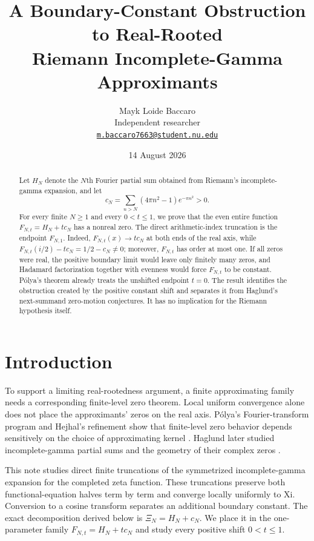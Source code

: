 \documentclass[11pt,a4paper]{amsart}
\title[Boundary-constant obstruction]
{A Boundary-Constant Obstruction to Real-Rooted\\
Riemann Incomplete-Gamma Approximants}
\author[Mayk Loide Baccaro]{Mayk Loide Baccaro\\
Independent researcher\\
\href{mailto:m.baccaro7663@student.nu.edu}{\texttt{m.baccaro7663@student.nu.edu}}}
\date{14 August 2026}
\theoremstyle{remark}
\begin{document}
\raggedbottom

\begin{abstract}
Let $H_N$ denote the $N$th Fourier partial sum obtained from Riemann's
incomplete-gamma expansion, and let
\[
 c_N=\sum_{n>N}(4\pi n^2-1)e^{-\pi n^2}>0.
\]
For every finite $N\geq1$ and every $0<t\leq1$, we prove that the even entire
function $F_{N,t}=H_N+t c_N$ has a nonreal zero.  The direct arithmetic-index
truncation is the endpoint $F_{N,1}$.  Indeed, $F_{N,t}(x)\to t c_N$ at both
ends of the real axis, while $F_{N,t}(i/2)-t c_N=1/2-c_N\ne0$; moreover,
$F_{N,t}$ has order at most one.  If all zeros were real, the positive
boundary limit would leave only finitely many zeros, and Hadamard
factorization together with evenness would force $F_{N,t}$ to be constant.
P\'olya's theorem already treats the unshifted endpoint $t=0$.  The result
identifies the obstruction created by the positive constant shift and separates it
from Haglund's next-summand zero-motion conjectures.  It has no implication
for the Riemann hypothesis itself.
\end{abstract}

\maketitle

\section{Introduction}

To support a limiting real-rootedness argument, a finite approximating family
needs a corresponding finite-level zero theorem.  Local uniform convergence
alone does not place the approximants' zeros on the real axis.  P\'olya's
Fourier-transform program and Hejhal's refinement show that finite-level zero
behavior depends sensitively on the choice of approximating kernel
\cite{Polya1926,Hejhal1990}.  Haglund later studied incomplete-gamma partial
sums and the geometry of their complex zeros \cite{Haglund2011}.

This note studies direct finite truncations of the symmetrized
incomplete-gamma expansion for the completed zeta function.  These truncations
preserve both functional-equation halves term by term and converge locally
uniformly to Xi.  Conversion to a cosine transform separates an additional
boundary constant.  The exact decomposition derived below is
$\Xi_N=H_N+c_N$.  We place it in the one-parameter family
$F_{N,t}=H_N+t c_N$ and study every positive shift $0<t\leq1$.
\end{document}
